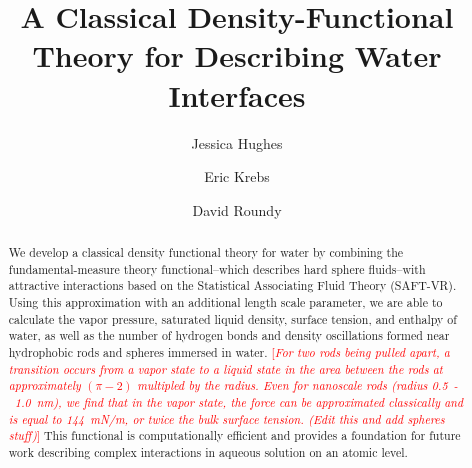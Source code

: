 \documentclass[letterpaper,twocolumn,amsmath,amssymb,prb]{revtex4-1}
\newcommand{\needsworknow}[1]{\textcolor{red}{[\emph{#1}]}}
\begin{document}
\title{A Classical Density-Functional Theory for Describing Water Interfaces}

\author{Jessica Hughes}
\author{Eric Krebs}
\author{David Roundy}

\begin{abstract}
{We develop a classical density functional theory for water by combining the
fundamental-measure theory functional--which describes hard sphere fluids--with
attractive interactions based on the Statistical Associating Fluid Theory
(SAFT-VR). Using this approximation with an additional length scale parameter, we are able to calculate the vapor pressure, saturated liquid density, surface tension, and enthalpy of water, as well as the number of hydrogen bonds and density oscillations formed near hydrophobic rods and spheres immersed in water. 
\needsworknow{For two rods being pulled apart, a transition occurs 
from a vapor state to a liquid state in the area between
the rods at approximately $(\pi-2)$ multipled by the radius. Even 
for nanoscale rods (radius 0.5~-~1.0~nm), we find that in the
vapor state, the force can be approximated
classically and is equal to 144~mN/m, or twice the bulk surface tension.
(Edit this and add spheres stuff)}
This functional is computationally efficient and provides a foundation for 
future work describing complex interactions in aqueous solution on an
atomic level.}
\tableofcontents
\end{abstract}
\maketitle
\end{document}
